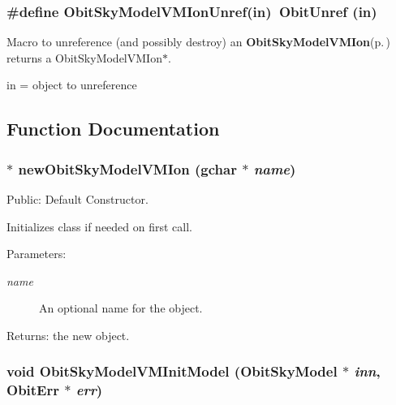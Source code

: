 \subsubsection{\setlength{\rightskip}{0pt plus 5cm}\#define Obit\-Sky\-Model\-VMIon\-Unref(in)\ Obit\-Unref (in)}\label{ObitSkyModelVMIon_8h_a0}


Macro to unreference (and possibly destroy) an {\bf Obit\-Sky\-Model\-VMIon}{\rm (p.\,\pageref{structObitSkyModelVMIon})} returns a Obit\-Sky\-Model\-VMIon$\ast$. 

in = object to unreference 

\subsection{Function Documentation}
\subsubsection{$\ast$ new\-Obit\-Sky\-Model\-VMIon (gchar $\ast$ {\em name})}\label{ObitSkyModelVMIon_8h_a4}


Public: Default Constructor. 

Initializes class if needed on first call. \begin{Desc}
\item[Parameters:]
\begin{description}
\item[{\em name}]An optional name for the object. \end{description}
\end{Desc}
\begin{Desc}
\item[Returns:]the new object. \end{Desc}
\subsubsection{\setlength{\rightskip}{0pt plus 5cm}void Obit\-Sky\-Model\-VMInit\-Model ({\bf Obit\-Sky\-Model} $\ast$ {\em inn}, {\bf Obit\-Err} $\ast$ {\em err})}\label{ObitSkyModelVMIon_8h_a9}



